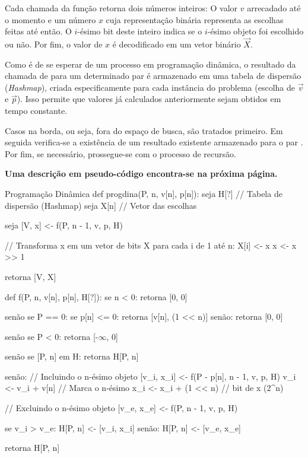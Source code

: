 \documentclass{homework}
\begin{document}
	Cada chamada da função  retorna dois números inteiros: O valor $v$ arrecadado até o momento e um número $x$ cuja representação binária representa as escolhas feitas até então. O $i$-ésimo bit deste inteiro indica se o $i$-ésimo objeto foi escolhido ou não. Por fim, o valor de $x$ é decodificado em um vetor binário $\vec{X}$.\par
	
	Como é de se esperar de um processo em programação dinâmica, o resultado da chamada de  para um determinado par \code{[P, n]} é armazenado em uma tabela de dispersão (\textit{Hashmap}), criada especificamente para cada instância do problema (escolha de $\vec{v}$ e $\vec{p}$). Isso permite que valores já calculados anteriormente sejam obtidos em tempo constante.\par
	
	Casos na borda, ou seja, fora do espaço de busca, são tratados primeiro. Em seguida verifica-se a existência de um resultado existente armazenado para o par \code{[P, n]}. Por fim, se necessário, prossegue-se com o processo de recursão.\par
	
	\textbf{Uma descrição em pseudo-código encontra-se na próxima página.}
	
	\newpage
	
	\begin{algor}{Programação Dinâmica}
	def progdina(P, n, v[n], p[n]):
		seja H[?] // Tabela de dispersão (Hashmap)
		seja X[n] // Vetor das escolhas
		
		seja [V, x] <- f(P, n - 1, v, p, H)
		
		// Transforma x em um vetor de bits X
		para cada i de 1 até n:
			X[i] <- x %
			x <- x >> 1
			
		retorna [V, X]
		
	def f(P, n, v[n], p[n], H[?]):
		se n < 0:
			retorna [0, 0]
			
		senão se P == 0:
			se p[n] <= 0:
				retorna [v[n], (1 << n)]
			senão:
				retorna [0, 0]
		
		senão se P < 0:
			retorna [-$\infty$, 0]
			
		senão se [P, n] em H:
			retorna H[P, n]
			
		senão:
			// Incluindo o n-ésimo objeto
			[v_i, x_i] <- f(P - p[n], n - 1, v, p, H)
			v_i <- v_i + v[n]     // Marca o n-ésimo
			x_i <- x_i + (1 << n) // bit de x (2^n)
			
			// Excluindo o n-ésimo objeto
			[v_e, x_e] <- f(P, n - 1, v, p, H)
			
			se v_i > v_e:
				H[P, n] <- [v_i, x_i]
			senão:
				H[P, n] <- [v_e, x_e]
				
			retorna H[P, n]
	\end{algor}
	
\end{document}

